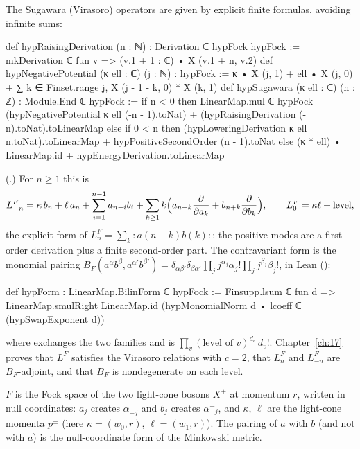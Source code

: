 The Sugawara (Virasoro) operators are given by explicit finite formulas, avoiding infinite sums:
\begin{leancode}
def hypRaisingDerivation (n : ℕ) : Derivation ℂ hypFock hypFock :=
  mkDerivation ℂ fun v => (v.1 + 1 : ℂ) • X (v.1 + n, v.2)
def hypNegativePotential (κ ell : ℂ) (j : ℕ) : hypFock :=
  κ • X (j, 1) + ell • X (j, 0) +
    ∑ k ∈ Finset.range j, X (j - 1 - k, 0) * X (k, 1)
def hypSugawara (κ ell : ℂ) (n : ℤ) : Module.End ℂ hypFock :=
  if n < 0 then
    LinearMap.mul ℂ hypFock (hypNegativePotential κ ell (-n - 1).toNat) +
      (hypRaisingDerivation (-n).toNat).toLinearMap
  else if 0 < n then
    (hypLoweringDerivation κ ell n.toNat).toLinearMap +
      hypPositiveSecondOrder (n - 1).toNat
  else (κ * ell) • LinearMap.id + hypEnergyDerivation.toLinearMap
\end{leancode}
(.)  For $n\ge1$ this is
\begin{equation}\label{ch18:eq:sugawara}
  L^F_{-n}=\kappa\,b_n+\ell\,a_n+\sum_{i=1}^{n-1}a_{n-i}b_i+\sum_{k\ge1}k\Bigl(a_{n+k}\frac{\partial}{\partial a_k}
  +b_{n+k}\frac{\partial}{\partial b_k}\Bigr),\qquad L^F_0=\kappa\ell+\text{level},
\end{equation}
the explicit form of $L^F_n=\sum_k{:}a(n-k)b(k){:}$; the positive modes are a first-order derivation plus a
finite second-order part.  The contravariant form is the monomial pairing
$B_F(a^\alpha b^\beta,a^{\alpha'}b^{\beta'})=\delta_{\alpha\beta'}\delta_{\beta\alpha'}\prod_jj^{\alpha_j}\alpha_j!\prod_jj^{\beta_j}\beta_j!$,
in Lean  ():
\begin{leancode}
def hypForm : LinearMap.BilinForm ℂ hypFock :=
  Finsupp.lsum ℂ fun d =>
    LinearMap.smulRight LinearMap.id (hypMonomialNorm d • lcoeff ℂ (hypSwapExponent d))
\end{leancode}
where  exchanges the two families and  is
$\prod_v(\text{level of }v)^{d_v}\,d_v!$.  Chapter~\ref{ch:17} proves that $L^F$ satisfies the
Virasoro relations with $c=2$, that $L^F_n$ and $L^F_{-n}$ are $B_F$-adjoint, and that $B_F$ is
nondegenerate on each level.

\begin{physics}
$F$ is the Fock space of the two light-cone bosons $X^\pm$ at momentum $r$, written in null coordinates:
$a_j$ creates $\alpha^+_{-j}$ and $b_j$ creates $\alpha^-_{-j}$, and $\kappa$, $\ell$ are the
light-cone momenta $p^\pm$ (here $\kappa=(w_0,r)$, $\ell=(w_1,r)$).  The pairing of $a$ with $b$ (and not with $a$) is the null-coordinate form of
the Minkowski metric.
\end{physics}

